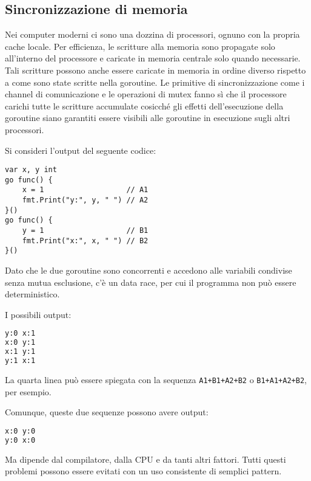 \documentclass[../../thesis.tex]{subfiles}
\begin{document}
    \subsection{Sincronizzazione di memoria}\label{subsec:sincronizzazione-di-memoria}
    Nei computer moderni ci sono una dozzina di processori, ognuno con la propria cache locale.
    Per efficienza, le scritture alla memoria sono propagate solo all'interno del processore e caricate in memoria centrale solo quando necessarie.
    Tali scritture possono anche essere caricate in memoria in ordine diverso rispetto a come sono state scritte nella goroutine.
    Le primitive di sincronizzazione come i channel di comunicazione e le operazioni di mutex fanno sì che il processore carichi tutte le scritture accumulate cosicché gli effetti dell'esecuzione della goroutine siano garantiti essere visibili alle goroutine in esecuzione sugli altri processori.
    \hfill \vspace{12pt}

    Si consideri l'output del seguente codice:
    \begin{lstlisting}[frame = single, label = {lst:lstlisting9-4.1}]
var x, y int
go func() {
    x = 1                   // A1
    fmt.Print("y:", y, " ") // A2
}()
go func() {
    y = 1                   // B1
    fmt.Print("x:", x, " ") // B2
}()
    \end{lstlisting}
    Dato che le due goroutine sono concorrenti e accedono alle variabili condivise senza mutua esclusione, c'è un data race, per cui il programma non può essere deterministico.
    \clearpage
    \newpage

    I possibili output:
    \begin{lstlisting}[language = bash, frame = L, label = {lst:lstlisting9-4.2}]
y:0 x:1
x:0 y:1
x:1 y:1
y:1 x:1
    \end{lstlisting}
    La quarta linea può essere spiegata con la sequenza \verb"A1+B1+A2+B2" o \verb"B1+A1+A2+B2", per esempio.

    Comunque, queste due sequenze possono avere output:
    \begin{lstlisting}[language = bash, frame = L, label = {lst:lstlisting9-4.3}]
x:0 y:0
y:0 x:0
    \end{lstlisting}
    Ma dipende dal compilatore, dalla CPU e da tanti altri fattori.
    Tutti questi problemi possono essere evitati con un uso consistente di semplici pattern.
\end{document}
